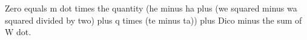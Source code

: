 Zero equals m dot times the quantity (he minus ha plus (we squared minus wa squared divided by two) plus q times (te minus ta)) plus Dico minus the sum of W dot.